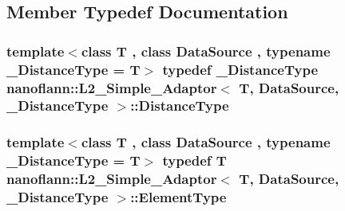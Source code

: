 \subsection{Member Typedef Documentation}
\hypertarget{structnanoflann_1_1_l2___simple___adaptor_a40d16c5ee10a87c22bc7a484dd992ed8}{
\subsubsection[{Distance\-Type}]{\setlength{\rightskip}{0pt plus 5cm}template$<$class T , class Data\-Source , typename \-\_\-\-Distance\-Type  = T$>$ typedef \-\_\-\-Distance\-Type {\bf nanoflann\-::\-L2\-\_\-\-Simple\-\_\-\-Adaptor}$<$ T, Data\-Source, \-\_\-\-Distance\-Type $>$\-::{\bf Distance\-Type}}}\label{structnanoflann_1_1_l2___simple___adaptor_a40d16c5ee10a87c22bc7a484dd992ed8}
\hypertarget{structnanoflann_1_1_l2___simple___adaptor_a882b70b60ea7842866d7863c63363bb5}{
\subsubsection[{Element\-Type}]{\setlength{\rightskip}{0pt plus 5cm}template$<$class T , class Data\-Source , typename \-\_\-\-Distance\-Type  = T$>$ typedef T {\bf nanoflann\-::\-L2\-\_\-\-Simple\-\_\-\-Adaptor}$<$ T, Data\-Source, \-\_\-\-Distance\-Type $>$\-::{\bf Element\-Type}}}\label{structnanoflann_1_1_l2___simple___adaptor_a882b70b60ea7842866d7863c63363bb5}


